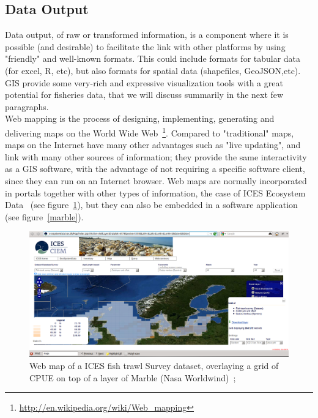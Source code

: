 \documentclass[11pt]{article} %
\begin{document}

\subsection{Data Output}\label{output}
Data output, of raw or transformed information, is a component where it is possible (and desirable) to facilitate the link with other platforms by using "friendly" and well-known formats. This could include formats for tabular data (for excel, R, etc), but also formats for spatial data (shapefiles, GeoJSON,etc).\\
GIS provide some very-rich and expressive visualization tools with a great potential for fisheries data, that we will discuss summarily in the next few paragraphs.\\
Web mapping is the process of designing, implementing, generating and delivering maps on the World Wide Web~\footnote{\url{http://en.wikipedia.org/wiki/Web_mapping}}. Compared to "traditional" maps, maps on the Internet have many other advantages such as "live updating", and link with many other sources of information; they provide the same interactivity as a GIS software, with the advantage of not requiring a specific software client, since they can run on an Internet browser. Web maps are normally incorporated in portals together with other types of information, the case of ICES Ecosystem Data~\cite{ices2} (see figure~\ref{webmap}), but they can also be embedded in a software application (see figure~\ref{marble}).

  \begin{figure}[!ht]%
    \begin{center} 
	\includegraphics[width=\textwidth]{webmap}
      \caption[Web map of a ICES fish trawl Survey dataset, overlaying a grid of CPUE on top of a layer of Marble (Nasa Worldwind);]
{Web map of a ICES fish trawl Survey dataset, overlaying a grid of CPUE on top of a layer of Marble (Nasa Worldwind)~\cite{ices2};}
      \label{webmap} %
    \end{center} 
  \end{figure}
\end{document}
